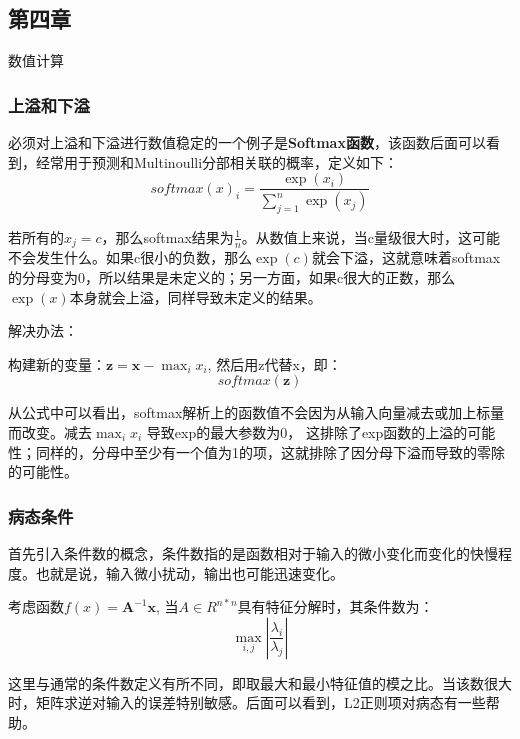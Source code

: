 \subsection{第四章}

数值计算

\subsubsection{上溢和下溢}

必须对上溢和下溢进行数值稳定的一个例子是\textbf{Softmax函数}，该函数后面可以看到，经常用于预测和Multinoulli分部相关联的概率，定义如下：
\begin{displaymath}
softmax(x)_i = \frac{\exp(x_i)}{\sum_{j=1}^{n}\exp(x_j)}
\end{displaymath}

若所有的$x_j = c$，那么softmax结果为$\frac{1}{n}$。从数值上来说，当c量级很大时，这可能不会发生什么。如果c很小的负数，那么$\exp(c)$就会下溢，这就意味着softmax的分母变为0，所以结果是未定义的；另一方面，如果c很大的正数，那么$\exp(x)$本身就会上溢，同样导致未定义的结果。

解决办法：

构建新的变量：$\mathbf{z} = \mathbf{x} - \max_i x_i$, 然后用z代替x，即：
\begin{displaymath}
softmax(\mathbf{z})
\end{displaymath}

从公式中可以看出，softmax解析上的函数值不会因为从输入向量减去或加上标量而改变。减去$\max_i x_i$ 导致exp的最大参数为0， 这排除了exp函数的上溢的可能性；同样的，分母中至少有一个值为1的项，这就排除了因分母下溢而导致的零除的可能性。

\subsubsection{病态条件}

首先引入条件数的概念，条件数指的是函数相对于输入的微小变化而变化的快慢程度。也就是说，输入微小扰动，输出也可能迅速变化。

考虑函数$f(x)= \mathbf{A}^{-1} \mathbf{x}$, 当$A \in R^{n * n}$具有特征分解时，其条件数为：
\begin{displaymath}
\max_{i, j} \left| \frac{\lambda_i}{\lambda_j} \right|
\end{displaymath}

这里与通常的条件数定义有所不同，即取最大和最小特征值的模之比。当该数很大时，矩阵求逆对输入的误差特别敏感。后面可以看到，L2正则项对病态有一些帮助。


